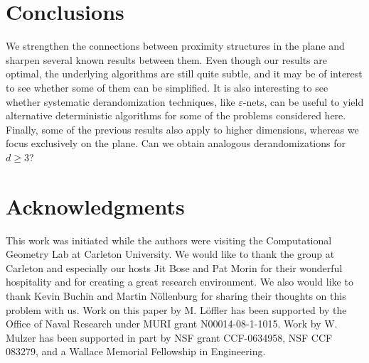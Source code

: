 \documentclass[11pt]{paper}
\newcommand {\eps} {\varepsilon}
\begin{document}
\section{Conclusions}

We strengthen the connections between proximity structures
in the plane and sharpen several known results between them.
Even though our results are optimal, the underlying algorithms are 
still quite subtle, and it may be of interest to see whether some of
them can be simplified. It is also interesting to see whether systematic
derandomization techniques, like $\eps$-nets, can be useful to yield 
alternative deterministic algorithms for some of the problems considered
here. Finally, some of the previous results also apply to higher dimensions,
whereas we focus exclusively on the plane. Can we obtain analogous 
derandomizations for $d \geq 3$?

\section*{Acknowledgments}

This work was initiated while the authors were visiting the Computational
Geometry Lab at Carleton University. We would like to thank the group
at Carleton and especially our hosts Jit Bose and Pat Morin for their
wonderful hospitality and for creating a great research environment.
We also would like to thank Kevin Buchin and Martin N\"ollenburg for
sharing their thoughts on this problem with us.
Work on this paper by M. L\"offler has been supported by the Office of
Naval Research under MURI grant N00014-08-1-1015.
Work by W. Mulzer has been supported in part by NSF grant CCF-0634958,
NSF CCF 083279, and a Wallace Memorial Fellowship in Engineering.

\small
\end{document}
